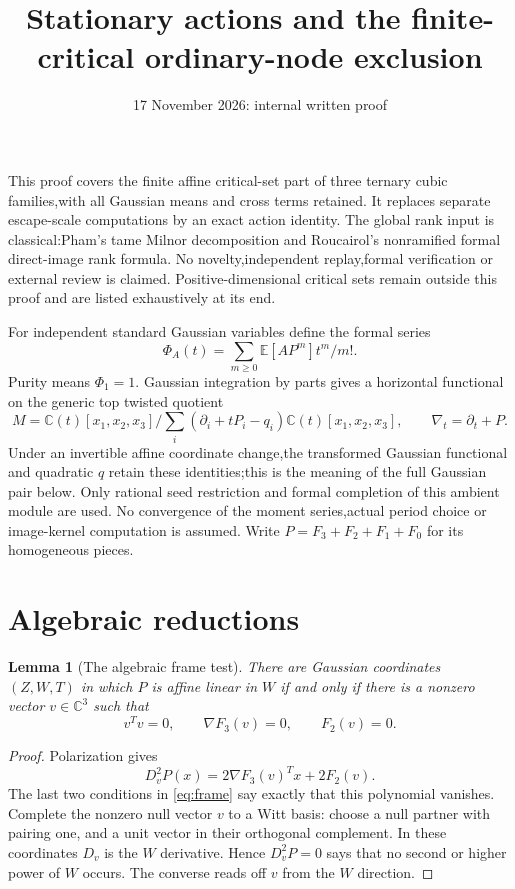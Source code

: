 \documentclass[11pt]{article}
\title{Stationary actions and the finite-critical ordinary-node exclusion}
\author{}\date{17 November 2026: internal written proof}
\newtheorem{lemma}[theorem]{Lemma}
\theoremstyle{definition}\newtheorem{definition}[theorem]{Definition}
\theoremstyle{remark}\newtheorem{remark}[theorem]{Remark}
\newcommand{\C}{\mathbb C}
\begin{document}
\maketitle
This proof covers the finite affine critical-set part of three ternary
cubic families,with all Gaussian means and cross terms retained.
It replaces separate escape-scale computations by an exact action
identity. The global rank input is classical:Pham's tame Milnor
decomposition and Roucairol's nonramified formal direct-image rank
formula. No novelty,independent replay,formal verification or external
review is claimed. Positive-dimensional critical sets remain outside
this proof and are listed exhaustively at its end.

For independent standard Gaussian variables define the formal series
\[
 \Phi_A(t)=\sum_{m\ge0}\mathbb E[AP^m]t^m/m!.
\]
Purity means $\Phi_1=1$. Gaussian integration by parts gives a horizontal
functional on the generic top twisted quotient
\[
 M=\mathbb C(t)[x_1,x_2,x_3]/
       \sum_i(\partial_i+tP_i-q_i)\mathbb C(t)[x_1,x_2,x_3],
 \qquad\nabla_t=\partial_t+P.
\]
Under an invertible affine coordinate change,the transformed Gaussian
functional and quadratic $q$ retain these identities;this is the
meaning of the full Gaussian pair below. Only rational seed restriction
and formal completion of this ambient module are used. No convergence
of the moment series,actual period choice or image-kernel computation
is assumed. Write $P=F_3+F_2+F_1+F_0$ for its homogeneous pieces.
\section{Algebraic reductions}
\begin{lemma}[The algebraic frame test]\label{lem:frame}
There are Gaussian coordinates $(Z,W,T)$ in which $P$ is affine linear
in $W$ if and only if there is a nonzero vector $v\in\C^3$ such that
\begin{equation}\label{eq:frame}
 v^Tv=0,\qquad \nabla F_3(v)=0,\qquad F_2(v)=0.
\end{equation}
\end{lemma}
\begin{proof}
Polarization gives
\[
 D_v^2P(x)=2\nabla F_3(v)^Tx+2F_2(v).
\]
The last two conditions in \eqref{eq:frame} say exactly that this
polynomial vanishes. Complete the nonzero null vector $v$ to a Witt
basis: choose a null partner with pairing one, and a unit vector in
their orthogonal complement. In these coordinates $D_v$ is the $W$
derivative. Hence $D_v^2P=0$ says that no second or higher power of
$W$ occurs. The converse reads off $v$ from the $W$ direction.
\end{proof}
\end{document}
